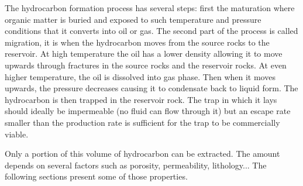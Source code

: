 The hydrocarbon formation process has several steps: first the maturation where organic matter is buried and exposed to such temperature and pressure conditions that it converts into oil or gas. The second part of the process is called migration, it is when the hydrocarbon moves from the source rocks to the reservoir. At high temperature the oil has a lower density allowing it to move upwards through fractures in the source rocks and the reservoir rocks. At even higher temperature, the oil is dissolved into gas phase. Then when it moves upwards, the pressure decreases causing it to condensate back to liquid form. The hydrocarbon is then trapped in the reservoir rock. The trap in which it lays should ideally be impermeable (no fluid can flow through it) but an escape rate smaller than the production rate is sufficient for the trap to be commercially viable. 

Only a portion of this volume of hydrocarbon can be extracted. The amount depends on several factors such as porosity, permeability, lithology...  The following sections present some of those properties. 
